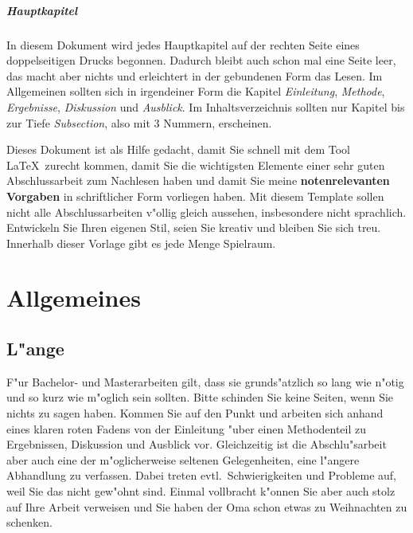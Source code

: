 \documentclass[12pt,a4paper,headinclude,twoside, plainheadsepline, open=right,numbers=noenddot]{scrreprt}
\begin{document}
\paragraph{Hauptkapitel}
In diesem Dokument wird jedes Hauptkapitel auf der rechten Seite eines doppelseitigen Drucks begonnen.
Dadurch bleibt auch schon mal eine Seite leer, das macht aber nichts und erleichtert in der gebundenen Form das Lesen.
Im Allgemeinen sollten sich in irgendeiner Form die Kapitel \emph{ Einleitung}, \emph{Methode}, \emph{Ergebnisse}, \emph{Diskussion} und \emph{ Ausblick}.
Im Inhaltsverzeichnis sollten nur Kapitel bis zur Tiefe \emph{ Subsection}, also mit 3 Nummern, erscheinen.

Dieses Dokument ist als Hilfe gedacht, damit Sie schnell mit dem Tool \LaTeX~zurecht kommen,
damit Sie die wichtigsten Elemente einer sehr guten Abschlussarbeit zum Nachlesen haben und damit Sie meine \textbf{notenrelevanten Vorgaben} in schriftlicher Form vorliegen haben.
Mit diesem Template sollen nicht alle Abschlussarbeiten v"ollig gleich aussehen, insbesondere nicht sprachlich.
Entwickeln Sie Ihren eigenen Stil, seien Sie kreativ und bleiben Sie sich treu. Innerhalb dieser Vorlage gibt es jede Menge Spielraum.

\chapter{Allgemeines}
\label{allgemeines}

\section{L"ange}
\label{laenge}

F"ur Bachelor- und Masterarbeiten gilt, dass sie grunds"atzlich so lang wie n"otig und so kurz wie m"oglich sein sollten.
Bitte schinden Sie keine Seiten, wenn Sie nichts zu sagen haben.
Kommen Sie auf den Punkt und arbeiten sich anhand eines klaren roten Fadens von der Einleitung "uber einen Methodenteil zu Ergebnissen, Diskussion und Ausblick vor.
Gleichzeitig ist die Abschlu"sarbeit aber auch eine der m"oglicherweise seltenen Gelegenheiten, eine l"angere Abhandlung zu verfassen.
Dabei treten evtl.~Schwierigkeiten und Probleme auf, weil Sie das nicht gew"ohnt sind.
Einmal vollbracht k"onnen Sie aber auch stolz auf Ihre Arbeit verweisen und Sie haben der Oma schon etwas zu Weihnachten zu schenken.
\end{document}
